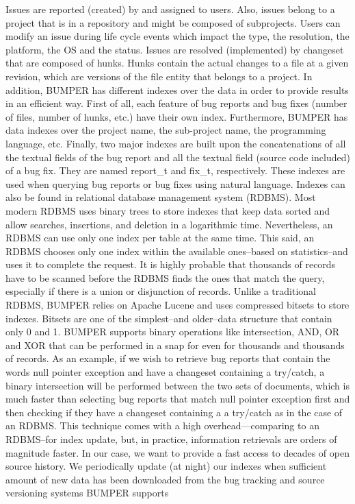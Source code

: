 \documentclass[conference]{IEEEtran}
\begin{document}
Issues are reported (created) by and assigned to users.
Also, issues belong to a project that is in a repository and might be composed of subprojects.
Users can modify an issue during life cycle events which impact the type, the resolution, the platform, the OS and the status.
Issues are resolved (implemented) by changeset that are composed of hunks.
Hunks contain the actual changes to a file at a given revision, which are versions of the file entity that belongs to a project.
In addition, BUMPER has different indexes over the data in order to provide results in an efficient way.
First of all, each feature of bug reports and bug fixes (number of files, number of hunks, etc.) have their own index.
Furthermore, BUMPER has data indexes over the project name, the sub-project name, the programming language, etc.
Finally, two major indexes are built upon the concatenations of all the textual fields of the bug report and all the textual field (source code included) of a bug fix.
They are named report\_t and fix\_t, respectively.
These indexes are used when querying bug reports or bug fixes using natural language.
Indexes can also be found in relational database management system (RDBMS).
Most modern RDBMS uses binary trees to store indexes that keep data sorted and allow searches, insertions, and deletion in a logarithmic time.
Nevertheless, an RDBMS can use only one index per table at the same time.
This said, an RDBMS chooses only one index within the available ones--based on statistics--and uses it to complete the request.
It is highly probable that thousands of records have to be scanned before the RDBMS finds the ones that match the query, especially if there is a union or disjunction of records.
Unlike a traditional RDBMS, BUMPER relies on Apache Lucene and uses compressed bitsets to store indexes.
Bitsets are one of the simplest--and older--data structure that contain only 0 and 1.
BUMPER supports binary operations like intersection, AND, OR and XOR that can be performed in a snap for even for thousands and thousands of records.
As an example, if we wish to retrieve bug reports that contain the words null pointer exception and have a changeset containing a try/catch, a binary intersection will be performed between the two sets of documents, which is much faster than selecting bug reports that match null pointer exception first and then checking if they have a changeset containing a a try/catch as in the case of an RDBMS.
This technique comes with a high overhead—comparing to an RDBMS--for index update, but, in practice, information retrievals are orders of magnitude faster.
In our case, we want to provide a fast access to decades of open source history.
We periodically update (at night) our indexes when sufficient amount of new data has been downloaded from the bug tracking and source versioning systems BUMPER supports
\end{document}
